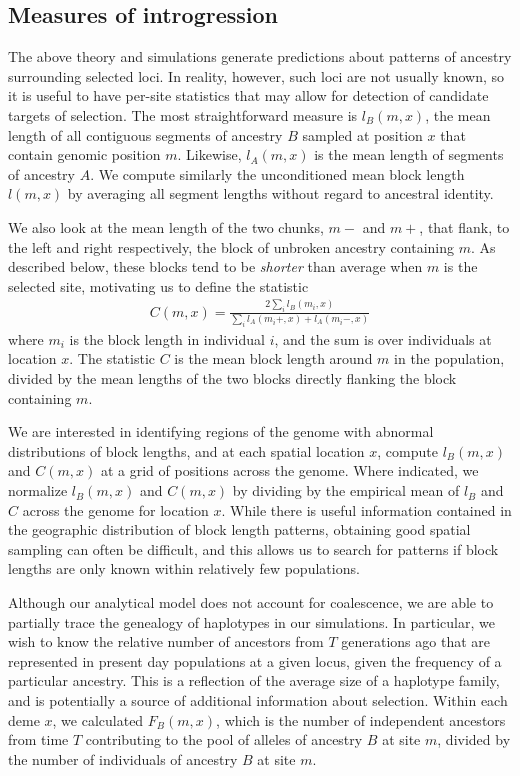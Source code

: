 \documentclass[11pt,letterpaper]{article}
\begin{document}
\subsection*{Measures of introgression}


The above theory and simulations generate predictions about patterns of ancestry surrounding selected loci. 
In reality, however, such loci are not usually known, so it is useful to have per-site statistics that may allow for detection of candidate targets of selection. 
The most straightforward measure is $l_B(m,x)$,  
the mean length of all contiguous segments of ancestry $B$ sampled at position $x$ that contain genomic position $m$.
Likewise, $l_A(m,x)$ is the mean length of segments of ancestry $A$.
We compute similarly the unconditioned mean block length $l(m,x)$
by averaging all segment lengths without regard to ancestral identity.

We also look at the mean length of the two chunks, $m-$ and $m+$, that flank, to the left and right respectively, 
the block of unbroken ancestry containing $m$. 
As described below, these blocks tend to be \emph{shorter} than average when $m$ is the selected site,
motivating us to define the statistic
\begin{align}
     C(m,x) =  \frac{2\sum_i{l_B(m_i,x)}}{\sum_i{l_A(m_i+,x)+l_A(m_i-,x)}}
\end{align}
where $m_i$ is the block length in individual $i$, and the sum is over individuals at location $x$.
The statistic $C$ is the mean block length around $m$ in the population, 
divided by the mean lengths of the two blocks directly flanking the block containing $m$. 

We are interested in identifying regions of the genome with abnormal distributions of block lengths, 
and at each spatial location $x$, compute $l_B(m,x)$ and $C(m,x)$ at a grid of positions across the genome. 
Where indicated, we normalize $l_B(m,x)$ and $C(m,x)$ by dividing by the empirical mean of $l_B$ and $C$ across the genome for location $x$.
While there is useful information contained in the geographic distribution of block length patterns, 
obtaining good spatial sampling can often be difficult, 
and this allows us to search for patterns if block lengths are only known within relatively few populations. 

Although our analytical model does not account for coalescence, we are able to partially trace the genealogy of haplotypes in our simulations. In particular, we wish to know the relative number of ancestors from $T$ generations ago that are represented in present day populations at a given locus, given the frequency of a particular ancestry. This is a reflection of the average size of a haplotype family, and is potentially a source of additional information about selection. Within each deme $x$, we calculated $F_B(m,x)$, which is the number of independent ancestors from time $T$ contributing to the pool of alleles of ancestry $B$ at site $m$, divided by the number of individuals of ancestry $B$ at site $m$.
\end{document}
